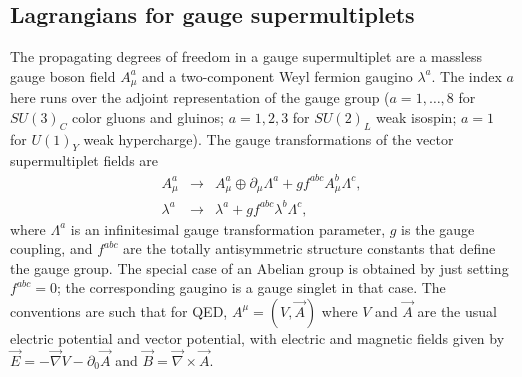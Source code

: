 \documentclass[12pt]{article}
\renewcommand{\theequation}{\arabic{section}.\arabic{equation}}
\def\BDminus{-}
\def\BDminus{+}
\def\BDminus{\ominus}
\def\BDminus{\oplus}
\def\beq{\begin{eqnarray}}
\def\eeq{\end{eqnarray}}
\begin{document}
\subsection{Lagrangians for gauge
supermultiplets}\label{subsec:susylagr.gauge}
\setcounter{footnote}{1}
\renewcommand{\theequation}{\arabic{section}.\arabic{subsection}.\arabic{equation}}
\setcounter{equation}{0}

The propagating degrees of freedom in a gauge supermultiplet are a
massless gauge boson field $A_\mu^a$ and a two-component Weyl fermion
gaugino $\lambda^a$. The index $a$ here runs over the adjoint
representation of the gauge group ($a=1,\ldots ,8$ for $SU(3)_C$ color
gluons and gluinos; $a=1,2,3$ for $SU(2)_L$ weak isospin; $a=1$ for
$U(1)_Y$ weak hypercharge). The gauge transformations of the vector
supermultiplet fields are
\beq
A^a_\mu &\rightarrow&  A^a_\mu
\BDminus \partial_\mu \Lambda^a + g f^{abc} A^b_\mu \Lambda^c ,
\label{Agaugetr}
\\
\lambda^a &\rightarrow& \lambda^a + g f^{abc} \lambda^b \Lambda^c
,
\label{lamgaugetr}
\eeq
where $\Lambda^a$ is an infinitesimal gauge transformation parameter, $g$
is the gauge coupling, and $f^{abc}$ are the totally antisymmetric
structure constants that define the gauge group. The special case of an
Abelian group is obtained by just setting $f^{abc}=0$;  the corresponding
gaugino is a gauge singlet in that case. The conventions are such that for
QED, $A^\mu = (V, \vec{A})$ where $V$ and $\vec{A}$ are the usual electric
potential and vector potential, with electric and magnetic fields given by
$\vec{E} = -\vec{\nabla} V - \partial_0 \vec{A}$ and $\vec{B} =
\vec{\nabla} \times \vec{A}$. 
\end{document}
